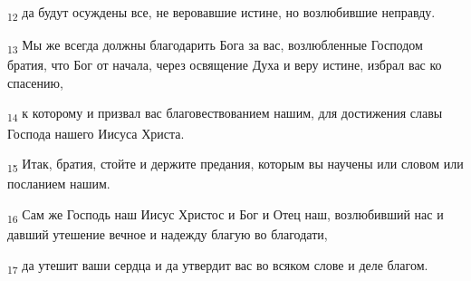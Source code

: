 \begin{tcolorbox}
\textsubscript{12} да будут осуждены все, не веровавшие истине, но возлюбившие неправду.
\end{tcolorbox}
\begin{tcolorbox}
\textsubscript{13} Мы же всегда должны благодарить Бога за вас, возлюбленные Господом братия, что Бог от начала, через освящение Духа и веру истине, избрал вас ко спасению,
\end{tcolorbox}
\begin{tcolorbox}
\textsubscript{14} к которому и призвал вас благовествованием нашим, для достижения славы Господа нашего Иисуса Христа.
\end{tcolorbox}
\begin{tcolorbox}
\textsubscript{15} Итак, братия, стойте и держите предания, которым вы научены или словом или посланием нашим.
\end{tcolorbox}
\begin{tcolorbox}
\textsubscript{16} Сам же Господь наш Иисус Христос и Бог и Отец наш, возлюбивший нас и давший утешение вечное и надежду благую во благодати,
\end{tcolorbox}
\begin{tcolorbox}
\textsubscript{17} да утешит ваши сердца и да утвердит вас во всяком слове и деле благом.
\end{tcolorbox}
